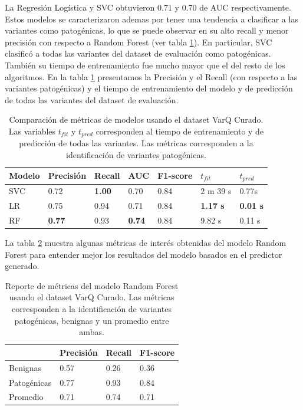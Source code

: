La Regresión Logística y SVC obtuvieron 0.71 y 0.70 de AUC respectivamente. Estos modelos se caracterizaron ademas por tener una tendencia a clasificar a las variantes como patogénicas, lo que se puede observar en su alto recall y menor precisión con respecto a Random Forest (ver tabla \ref{tab:metricsmodel}). En particular, SVC clasificó a todas las variantes del dataset de evaluación como patogénicas. También su tiempo de entrenamiento fue mucho mayor que el del resto de los algoritmos. En la tabla \ref{tab:metricsmodel} presentamos la Precisión y el Recall (con respecto a las variantes patogénicas) y el tiempo de entrenamiento del modelo y de predicción de todas las variantes del dataset de evaluación.

\begin{table}[H]
\centering
\begin{tabular}{|l|l|l|l|l|l|l|}
\hline
Modelo & Precisión & Recall & AUC & F1-score & $t_{fit}$ & $t_{pred}$ \\ \hline
SVC    & 0.72 & \textbf{1.00} & 0.70 & 0.84 & 2 m 39 s & 0.77s \\ \hline
LR     & 0.75 & 0.94 & 0.71 & 0.84 & \textbf{1.17 s} & \textbf{0.01 s} \\ \hline
RF     & \textbf{0.77} & 0.93 & \textbf{0.74} & 0.84 & 9.82 s & 0.11 s \\ \hline
\end{tabular}
\caption{Comparación de métricas de modelos usando el dataset VarQ Curado. Las variables $t_{fit}$ y $t_{pred}$ corresponden al tiempo de entrenamiento y de predicción de todas las variantes. Las métricas corresponden a la identificación de variantes patogénicas.}
\label{tab:metricsmodel}
\end{table}

La tabla \ref{tab:metrics_varq} muestra algunas métricas de interés obtenidas del modelo Random Forest para entender mejor los resultados del modelo basados en el predictor generado.

\begin{table}[H]
\centering
\begin{tabular}{|l|l|l|l|}
\hline
              & Precisión & Recall & F1-score \\ \hline
Benignas      & 0.57      & 0.26   & 0.36     \\ \hline
Patogénicas   & 0.77      & 0.93   & 0.84     \\ \hline
Promedio      & 0.71      & 0.74   & 0.71     \\ \hline
\end{tabular}
\caption{Reporte de métricas del modelo Random Forest usando el dataset VarQ Curado. Las métricas corresponden a la identificación de variantes patogénicas, benignas y un promedio entre ambas.}
\label{tab:metrics_varq}
\end{table}

